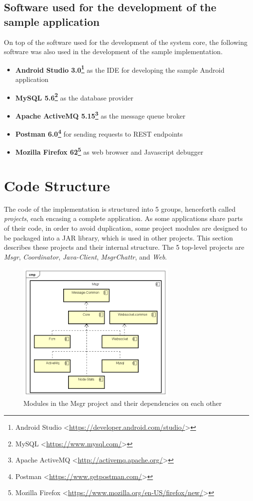 \subsection*{Software used for the development of the sample application}
On top of the software used for the development of the system core, the following software was also used in the development of the sample implementation. 
\begin{itemize}
    \item \textbf{Android Studio 3.0\footnote{Android Studio <\url{https://developer.android.com/studio/}>}} as the IDE for developing the sample Android application
    \item \textbf{MySQL 5.6\footnote{MySQL <\url{https://www.mysql.com/}>}} as the database provider
    \item \textbf{Apache ActiveMQ 5.15\footnote{Apache ActiveMQ <\url{http://activemq.apache.org/}>}} as the message queue broker
    \item \textbf{Postman 6.0\footnote{Postman <\url{https://www.getpostman.com/}>}} for sending requests to REST endpoints
    \item \textbf{Mozilla Firefox 62\footnote{Mozilla Firefox <\url{https://www.mozilla.org/en-US/firefox/new/}>}} as web browser and Javascript debugger
\end{itemize}

\section{Code Structure}
The code of the implementation is structured into 5 groups, henceforth called \textit{projects}, each encasing a complete application. As some applications share parts of their code, in order to avoid duplication, some project modules are designed to be packaged into a JAR library, which is used in other projects. This section describes these projects and their internal structure. The 5 top-level projects are \textit{Msgr}, \textit{Coordinator}, \textit{Java-Client}, \textit{MsgrChattr}, and \textit{Web}.

\begin{figure}[!ht]
	\centering
	\includegraphics[width=0.7\textwidth]{figures/04_implementation/msgr-project}
    \caption{Modules in the Msgr project and their dependencies on each other}
    \label{fig:msgr-project}
\end{figure}

